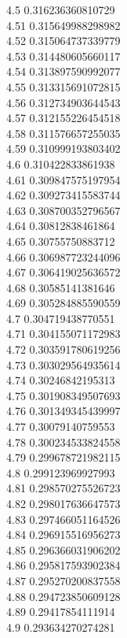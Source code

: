 {4.5	0.316236360810729\\
4.51	0.315649988298982\\
4.52	0.315064737339779\\
4.53	0.314480605660117\\
4.54	0.313897590992077\\
4.55	0.313315691072815\\
4.56	0.312734903644543\\
4.57	0.312155226454518\\
4.58	0.311576657255035\\
4.59	0.310999193803402\\
4.6	0.310422833861938\\
4.61	0.309847575197954\\
4.62	0.309273415583744\\
4.63	0.308700352796567\\
4.64	0.30812838461864\\
4.65	0.30755750883712\\
4.66	0.306987723244096\\
4.67	0.306419025636572\\
4.68	0.30585141381646\\
4.69	0.305284885590559\\
4.7	0.304719438770551\\
4.71	0.304155071172983\\
4.72	0.303591780619256\\
4.73	0.303029564935614\\
4.74	0.30246842195313\\
4.75	0.301908349507693\\
4.76	0.301349345439997\\
4.77	0.30079140759553\\
4.78	0.300234533824558\\
4.79	0.299678721982115\\
4.8	0.299123969927993\\
4.81	0.298570275526723\\
4.82	0.298017636647573\\
4.83	0.297466051164526\\
4.84	0.296915516956273\\
4.85	0.296366031906202\\
4.86	0.295817593902384\\
4.87	0.295270200837558\\
4.88	0.294723850609128\\
4.89	0.29417854111914\\
4.9	0.293634270274281\\
}
